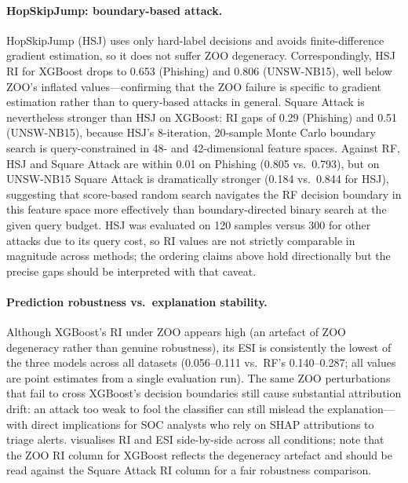 \documentclass[runningheads]{llncs}
\begin{document}
\paragraph{HopSkipJump: boundary-based attack.}
HopSkipJump (HSJ) uses only hard-label decisions and avoids finite-difference
gradient estimation, so it does not suffer ZOO degeneracy.  Correspondingly,
HSJ RI for XGBoost drops to 0.653 (Phishing) and 0.806 (UNSW-NB15), well below
ZOO's inflated values---confirming that the ZOO failure is specific to gradient
estimation rather than to query-based attacks in general.  Square Attack is
nevertheless stronger than HSJ on XGBoost: RI gaps of 0.29 (Phishing) and 0.51
(UNSW-NB15), because HSJ's 8-iteration, 20-sample Monte Carlo boundary search
is query-constrained in 48- and 42-dimensional feature spaces.  Against RF, HSJ
and Square Attack are within 0.01 on Phishing (0.805 vs.\ 0.793), but on
UNSW-NB15 Square Attack is dramatically stronger (0.184 vs.\ 0.844 for HSJ),
suggesting that score-based random search navigates the RF decision boundary in
this feature space more effectively than boundary-directed binary search at the
given query budget.  HSJ was evaluated on 120 samples versus 300 for other
attacks due to its query cost, so RI values are not strictly comparable in
magnitude across methods; the ordering claims above hold directionally but the
precise gaps should be interpreted with that caveat.

\paragraph{Prediction robustness vs.\ explanation stability.}
Although XGBoost's RI under ZOO appears high (an artefact of ZOO degeneracy
rather than genuine robustness), its ESI is consistently the lowest of the three
models across all datasets (0.056--0.111 vs.\ RF's 0.140--0.287;
all values are point estimates from a single evaluation run).  The same ZOO perturbations that fail to cross XGBoost's decision boundaries
still cause substantial attribution drift: an attack too weak to fool the
classifier can still mislead the explanation---with direct implications for SOC
analysts who rely on SHAP attributions to triage alerts.   visualises
RI and ESI side-by-side across all conditions; note that the ZOO RI column for
XGBoost reflects the degeneracy artefact and should be read against the Square
Attack RI column for a fair robustness comparison.
\end{document}
